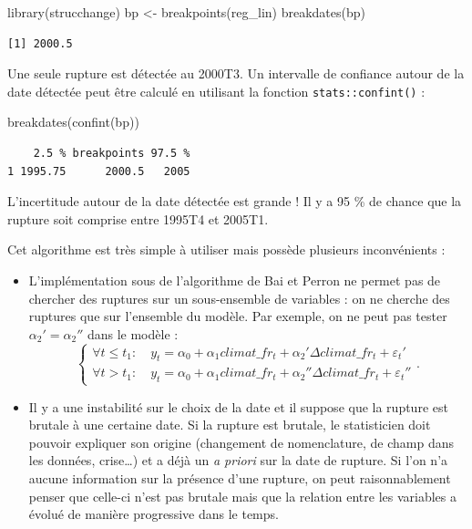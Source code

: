 \documentclass[
  a4paper,
  DIV=11,
  numbers=noendperiod,
  french]{scrartcl}
\newenvironment{Shaded}{\begin{snugshade}}{\end{snugshade}}
\newcommand{\FunctionTok}[1]{\textcolor[rgb]{0.28,0.35,0.67}{#1}}
\newcommand{\NormalTok}[1]{\textcolor[rgb]{0.00,0.23,0.31}{#1}}
\newcommand{\OtherTok}[1]{\textcolor[rgb]{0.00,0.23,0.31}{#1}}
\newcommand\1{{\mathds 1}}
\theoremstyle{remark}
\begin{document}
\begin{Shaded}
\begin{Highlighting}[]
\FunctionTok{library}\NormalTok{(strucchange)}
\NormalTok{bp }\OtherTok{\textless{}{-}} \FunctionTok{breakpoints}\NormalTok{(reg\_lin)}
\FunctionTok{breakdates}\NormalTok{(bp)}
\end{Highlighting}
\end{Shaded}

\begin{verbatim}
[1] 2000.5
\end{verbatim}

Une seule rupture est détectée au 2000T3. Un intervalle de confiance
autour de la date détectée peut être calculé en utilisant la fonction
\texttt{stats::confint()} :

\begin{Shaded}
\begin{Highlighting}[]
\FunctionTok{breakdates}\NormalTok{(}\FunctionTok{confint}\NormalTok{(bp))}
\end{Highlighting}
\end{Shaded}

\begin{verbatim}
    2.5 % breakpoints 97.5 %
1 1995.75      2000.5   2005
\end{verbatim}

L'incertitude autour de la date détectée est grande ! Il y a 95 \% de
chance que la rupture soit comprise entre 1995T4 et 2005T1.

Cet algorithme est très simple à utiliser mais possède plusieurs
inconvénients :

\begin{itemize}
\item
  L'implémentation sous  de l'algorithme de Bai et
  Perron ne permet pas de chercher des ruptures sur un sous-ensemble de
  variables : on ne cherche des ruptures que sur l'ensemble du modèle.
  Par exemple, on ne peut pas tester \(\alpha_2' = \alpha_2''\) dans le
  modèle : \[
  \begin{cases}
  \forall t \leq t_1 :\quad y_t = \alpha_0 + \alpha_1 climat\_fr_t + \alpha_2' \Delta climat\_fr_t + \varepsilon_t' \\
  \forall t > t_1 :\quad y_t = \alpha_0 + \alpha_1 climat\_fr_t + \alpha_2'' \Delta climat\_fr_t + \varepsilon_t''
  \end{cases}.
  \]
\item
  Il y a une instabilité sur le choix de la date et il suppose que la
  rupture est brutale à une certaine date. Si la rupture est brutale, le
  statisticien doit pouvoir expliquer son origine (changement de
  nomenclature, de champ dans les données, crise\ldots) et a déjà un
  \emph{a priori} sur la date de rupture. Si l'on n'a aucune information
  sur la présence d'une rupture, on peut raisonnablement penser que
  celle-ci n'est pas brutale mais que la relation entre les variables a
  évolué de manière progressive dans le temps.
\end{itemize}
\end{document}
